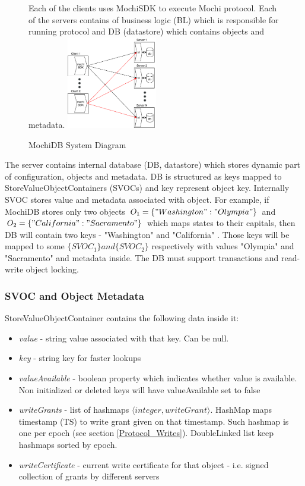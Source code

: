 \documentclass[letterpaper,twocolumn,10pt]{article}
\begin{document}
\begin{figure}
\caption{MochiDB System Diagram}
\small
Each of the clients uses MochiSDK to execute Mochi protocol. Each of the servers contains of business logic (BL) which is responsible for running protocol and DB (datastore) which contains objects and metadata.
\centering
\includegraphics[width=0.35\textwidth]{System_View.png}
\label{fig:system_view}
\end{figure}

The server contains internal database (DB, datastore) which stores dynamic part of configuration, objects and metadata. DB is structured as keys mapped to StoreValueObjectContainers (SVOCs) and key represent object key. 
Internally SVOC stores value and metadata associated with object. For example, if MochiDB stores only two objects \(O_{1} = \{ "Washington":"Olympia" \} \) and \(O_{2} = \{ "California" : "Sacramento"\} \) which maps states to their capitals, then DB will contain two keys - {"Washington" and "California" }. Those keys will be mapped to some \( \{ SVOC_{1} \} and \{ SVOC_{2} \} \) respectively with values "Olympia" and "Sacramento" and metadata inside. The DB must support transactions and read-write object locking.

\subsubsection{SVOC and Object Metadata}
StoreValueObjectContainer contains the following data inside it:
\begin{itemize}[noitemsep, topsep=0pt,]
  \item \textit{value} - string value associated with that key. Can be null.
  \item  \textit{key} - string key for faster lookups
  \item  \textit{valueAvailable} - boolean property which indicates whether value is available. Non initialized or deleted keys will have valueAvailable set to false
  \item \textit{writeGrants} - list of hashmaps $\langle integer, writeGrant \rangle$. HashMap maps timestamp (TS) to write grant given on that timestamp. Such hashmap is one per epoch (see section \ref{Protocol_Writes}). DoubleLinked list keep hashmaps sorted by epoch.
  \item \textit{writeCertificate} - current write certificate for that object - i.e. signed collection of grants by different servers
\end{itemize}
\end{document}
